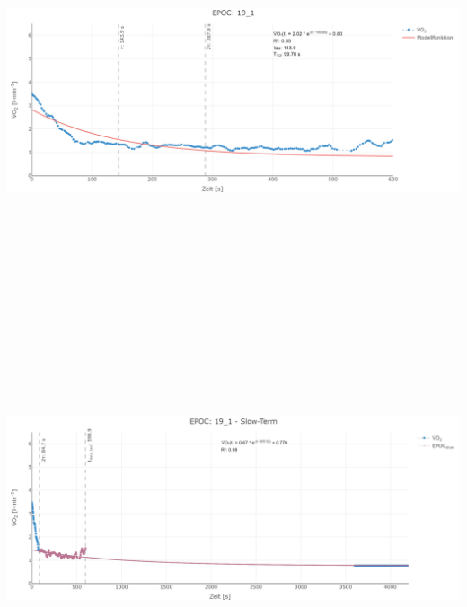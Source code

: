 \documentclass[
  letterpaper,
  DIV=11]{scrartcl}
\begin{document}
\includegraphics[width=11.45833in,height=4.6875in]{images/19_1_tau.png}
\includegraphics[width=11.45833in,height=4.6875in]{images/19_1_slow.png}
\end{document}
